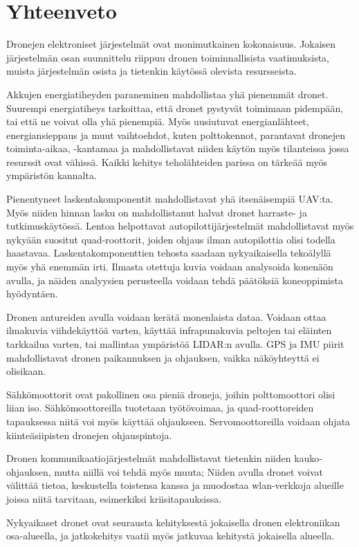 \chapter{Yhteenveto}
\label{ch:yhteenveto}

Dronejen elektroniset järjestelmät ovat monimutkainen kokonaisuus. Jokaisen
järjestelmän osan suunnittelu riippuu dronen toiminnallisista vaatimuksista,
muista järjestelmän osista ja tietenkin käytössä olevista resursseista.

Akkujen energiatiheyden paraneminen mahdollistaa yhä pienemmät dronet. Suurempi
energiatiheys tarkoittaa, että dronet pystyvät toimimaan pidempään, tai että ne
voivat olla yhä pienempiä. Myös uusiutuvat energianlähteet, energiansieppaus ja
muut vaihtoehdot, kuten polttokennot, parantavat dronejen toiminta-aikaa,
-kantamaa ja mahdollistavat niiden käytön myös tilanteissa jossa resurssit ovat
vähissä. Kaikki kehitys teholähteiden parissa on tärkeää myös ympäristön
kannalta.

Pienentyneet laskentakomponentit mahdollistavat yhä itsenäisempiä UAV:ta. Myös
niiden hinnan lasku on mahdollistanut halvat dronet harraste- ja
tutkimuskäytössä. Lentoa helpottavat autopilottijärjestelmät mahdollistavat
myös nykyään suositut quad-roottorit, joiden ohjaus ilman autopilottia olisi
todella haastavaa.  Laskentakomponenttien tehosta saadaan nykyaikaisella
tekoälyllä myös yhä enemmän irti. Ilmasta otettuja kuvia voidaan analysoida
konenäön avulla, ja näiden analyysien perusteella voidaan tehdä päätöksiä
koneoppimista hyödyntäen.

Dronen antureiden avulla voidaan kerätä monenlaista dataa. Voidaan ottaa
ilmakuvia viihdekäyttöä varten, käyttää infrapunakuvia peltojen tai eläinten
tarkkailua varten, tai mallintaa ympäristöä LIDAR:n avulla. GPS ja IMU piirit
mahdollistavat dronen paikannuksen ja ohjauksen, vaikka näköyhteyttä ei
olisikaan.

Sähkömoottorit ovat pakollinen osa pieniä droneja, joihin polttomoottori olisi
liian iso. Sähkömoottoreilla tuotetaan työtövoimaa, ja quad-roottoreiden
tapauksessa niitä voi myös käyttää ohjaukseen. Servomoottoreilla voidaan ohjata
kiinteäsiipisten dronejen ohjauspintoja.

Dronen kommunikaatiojärjestelmät mahdollistavat tietenkin niiden
kauko-ohjauksen, mutta niillä voi tehdä myös muuta; Niiden avulla dronet voivat
välittää tietoa, keskustella toistensa kanssa ja muodostaa wlan-verkkoja
alueille joissa niitä tarvitaan, esimerkiksi kriisitapauksissa.

Nykyaikaset dronet ovat seurausta kehityksestä jokaisella dronen elektroniikan
osa-alueella, ja jatkokehitys vaatii myös jatkuvaa kehitystä jokaisella
alueella.
